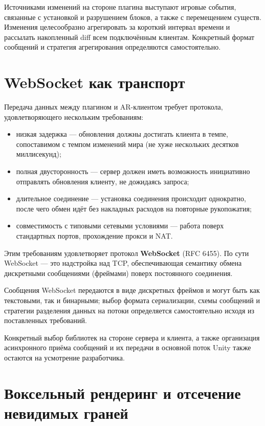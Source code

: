 \documentclass[a4paper,12pt]{article}
\begin{document}
Источниками изменений на стороне плагина выступают игровые события, связанные с установкой и разрушением блоков, а также с перемещением существ. Изменения целесообразно агрегировать за короткий интервал времени и рассылать накопленный diff всем подключённым клиентам. Конкретный формат сообщений и стратегия агрегирования определяются самостоятельно.



\section*{WebSocket как транспорт}

Передача данных между плагином и AR-клиентом требует протокола, удовлетворяющего нескольким требованиям:

\begin{itemize}
    \item низкая задержка --- обновления должны достигать клиента в темпе, сопоставимом с темпом изменений мира (не хуже нескольких десятков миллисекунд);
    \item полная двусторонность --- сервер должен иметь возможность инициативно отправлять обновления клиенту, не дожидаясь запроса;
    \item длительное соединение --- установка соединения происходит однократно, после чего обмен идёт без накладных расходов на повторные рукопожатия;
    \item совместимость с типовыми сетевыми условиями --- работа поверх стандартных портов, прохождение прокси и NAT.
\end{itemize}

Этим требованиям удовлетворяет протокол \textbf{WebSocket} (RFC 6455). По сути WebSocket --- это надстройка над TCP, обеспечивающая семантику обмена дискретными сообщениями (фреймами) поверх постоянного соединения.

Сообщения WebSocket передаются в виде дискретных фреймов и могут быть как текстовыми, так и бинарными; выбор формата сериализации, схемы сообщений и стратегии разделения данных на потоки определяется самостоятельно исходя из поставленных требований.

Конкретный выбор библиотек на стороне сервера и клиента, а также организация асинхронного приёма сообщений и их передачи в основной поток Unity также остаются на усмотрение разработчика.



\section*{Воксельный рендеринг и отсечение невидимых граней}
\end{document}
